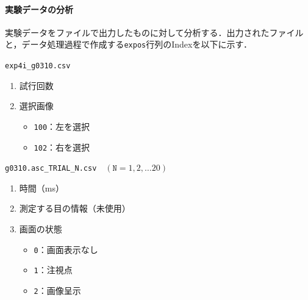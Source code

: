 \paragraph{実験データの分析}
\newcommand{\expos}{\texttt{expos}}
実験データを\csv ファイルで出力したものに対して分析する．出力された\csv ファイルと，データ処理過程で作成する\expos 行列のIndexを以下に示す．
\begin{center}
    \begin{framed}
        \begin{minipage}[t][]{.23\textwidth}
            \begin{center}
                \texttt{exp4i\_g0310.csv}
            \end{center}
            \begin{enumerate}
                \renewcommand{\labelenumi}{\theenumi 列目}
                \item 試行回数
                \item 選択画像
                      \begin{itemize}
                          \setlength{\leftskip}{-2em}
                          \item \texttt{100}：左を選択
                          \item \texttt{102}：右を選択
                      \end{itemize}
            \end{enumerate}
        \end{minipage}
        \begin{minipage}[t]{.48\textwidth}
            \begin{center}
                \texttt{g0310.asc\_TRIAL\_N.csv}\ \ \((\texttt{N}={1,2,\dots 20})\)
            \end{center}
            \begin{enumerate}
                \renewcommand{\labelenumi}{\theenumi 列目}
                \item 時間（ms）
                \item 測定する目の情報（未使用）
                \item 画面の状態
                      \begin{itemize}
                          \setlength{\leftskip}{-2em}
                          \item \texttt{0}：画面表示なし
                          \item \texttt{1}：注視点
                          \item \texttt{2}：画像呈示

\end{itemize}
\end{enumerate}
\end{minipage}
\end{framed}
\end{center}
